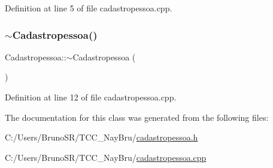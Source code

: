 Definition at line 5 of file cadastropessoa.\+cpp.

\hypertarget{class_cadastropessoa_a19e6b26d15f77eb6844e67b1246661cf}{}\label{class_cadastropessoa_a19e6b26d15f77eb6844e67b1246661cf} 
\subsubsection{\texorpdfstring{$\sim$\+Cadastropessoa()}{~Cadastropessoa()}}
{\footnotesize\ttfamily Cadastropessoa\+::$\sim$\+Cadastropessoa (\begin{DoxyParamCaption}{ }\end{DoxyParamCaption})}



Definition at line 12 of file cadastropessoa.\+cpp.



The documentation for this class was generated from the following files\+:\begin{DoxyCompactItemize}
\item 
C\+:/\+Users/\+Bruno\+S\+R/\+T\+C\+C\+\_\+\+Nay\+Bru/\hyperlink{cadastropessoa_8h}{cadastropessoa.\+h}\item 
C\+:/\+Users/\+Bruno\+S\+R/\+T\+C\+C\+\_\+\+Nay\+Bru/\hyperlink{cadastropessoa_8cpp}{cadastropessoa.\+cpp}\end{DoxyCompactItemize}
